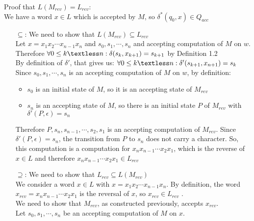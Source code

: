 Proof that $L(M_{rev}) = L_{rev}$:\\
We have a word $x\in L$ which is accepted by $M$, so $\delta^{*}(q_{0},x)\in Q_{acc}$
\begin{itemize}
    \item[$\subseteq$:] We need to show that $L(M_{rev})\subseteq L_{rev}$\\
    Let $x=x_{1}x_{2}\cdots x_{n-1}x_{n}$ and $s_{0},s_{1},\cdots,s_{n}$ and accepting computation of $M$ on $w$.\\
    Therefore $\forall 0 \leq k \textless n: \delta(s_{k},x_{k+1})=s_{k+1}$  by Definition 1.2\\
    By definition of $\delta'$, that gives us: $\forall 0 \leq k \textless n: \delta'(s_{k+1}, x_{n+1}) = s_{k}$\\
    Since $s_{0},s_{1},\cdots,s_{n}$ is an accepting computation of $M$ on $w$, by definition:
    \begin{itemize}
        \item $s_{0}$ is an initial state of $M$, so it is an accepting state of $M_{rev}$
        \item $s_{n}$ is an accepting state of $M$, so there is an initial state $P$ of $M_{rev}$ with $\delta'(P,\epsilon)=s_{n}$
    \end{itemize}
    Therefore $P,s_{n},s_{n-1},\cdots, s_{2},s_{1}$ is an accepting computation of $M_{rev}$. Since $\delta'(P,\epsilon)=s_{n}$, the transition from $P$ to $s_{n}$ does not carry a character. So, this computation is a computation for $x_{n}x_{n-1}\cdots x_{2}x_{1}$, which is the reverse of $x \in L$ and therefore $x_{n}x_{n-1}\cdots x_{2}x_{1} \in L_{rev}$
    \item[$\supseteq$:] We need to show that $L_{rev}\subseteq L(M_{rev})$\\
    We consider a word $x \in L$ with $x=x_{1}x_{2}\cdots x_{n-1}x_{n}$. By definition, the word $x_{rev} = x_{n}x_{n-1}\cdots x_{2}x_{1}$ is the reversal of $x$, so $x_{rev} \in L_{rev}$ .\\
    We need to show that $M_{rev}$, as constructed previously, accepts $x_{rev}$.\\
    Let $s_{0}, s_{1},\cdots,s_{n}$ be an accepting computation of $M$ on $x$.\\

\end{itemize}
